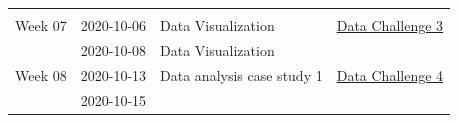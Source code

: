 \documentclass[
]{book}
\begin{document}
\begin{longtable}[]{@{}llll@{}}
\begin{minipage}[t]{0.22\columnwidth}
\strut
\end{minipage}\tabularnewline
\begin{minipage}[t]{0.22\columnwidth}\raggedright
Week 07\strut
\end{minipage} & \begin{minipage}[t]{0.22\columnwidth}\raggedright
2020-10-06\strut
\end{minipage} & \begin{minipage}[t]{0.22\columnwidth}\raggedright
Data Visualization\strut
\end{minipage} & \begin{minipage}[t]{0.22\columnwidth}\raggedright
\href{https://classroom.github.com/a/ndGrSqaq}{Data Challenge 3}\strut
\end{minipage}\tabularnewline
\begin{minipage}[t]{0.22\columnwidth}\raggedright
\strut
\end{minipage} & \begin{minipage}[t]{0.22\columnwidth}\raggedright
2020-10-08\strut
\end{minipage} & \begin{minipage}[t]{0.22\columnwidth}\raggedright
Data Visualization\strut
\end{minipage} & \begin{minipage}[t]{0.22\columnwidth}\raggedright
\strut
\end{minipage}\tabularnewline
\begin{minipage}[t]{0.22\columnwidth}\raggedright
Week 08\strut
\end{minipage} & \begin{minipage}[t]{0.22\columnwidth}\raggedright
2020-10-13\strut
\end{minipage} & \begin{minipage}[t]{0.22\columnwidth}\raggedright
Data analysis case study 1\strut
\end{minipage} & \begin{minipage}[t]{0.22\columnwidth}\raggedright
\href{https://classroom.github.com/a/fYDB-CfS}{Data Challenge 4}\strut
\end{minipage}\tabularnewline
\begin{minipage}[t]{0.22\columnwidth}\raggedright
\strut
\end{minipage} & \begin{minipage}[t]{0.22\columnwidth}\raggedright
2020-10-15\strut
\end{minipage} & \begin{minipage}[t]{0.22\columnwidth}\raggedright

\end{minipage}
\end{longtable}
\end{document}
